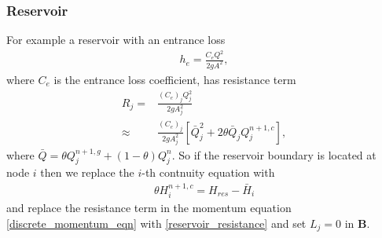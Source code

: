 {\color{red}

\subsubsection{Reservoir}

For example a reservoir with an entrance loss 
\begin{align}
h_e = \frac{C_e Q^2}{2 g A^2},
\end{align}
where $C_e$ is the entrance loss coefficient, has resistance term
\begin{align}\label{reservoir_resistance}
R_j =& \frac{(C_e)_j Q_j^2}{2 g A_j^2} \\
\approx & \frac{(C_e)_j }{2 g A_j^2} \left[ \bar{Q}_j^2 + 2 \theta \bar{Q}_j Q_j^{n+1,c}  \right],
\end{align}
where $\bar{Q} = \theta Q_j^{n+1,g} + (1-\theta) Q_j^n$. So if the reservoir boundary is located at node $i$ then we replace the $i$-th contnuity equation with 
\begin{align}
\theta H_i^{n+1,c} = H_{res} - \bar{H}_i
\end{align}
and replace the resistance term in the momentum equation \eqref{discrete_momentum_eqn} with \eqref{reservoir_resistance} and set $L_j = 0$ in $\mathbf{B}$.

}